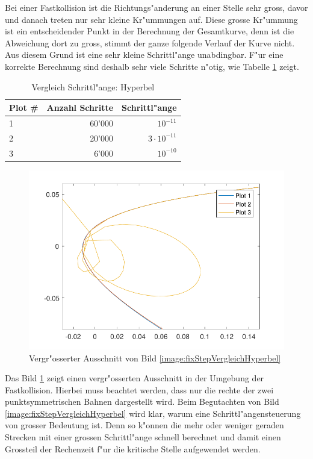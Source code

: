 \begin{refsection}
Bei einer Fastkollision ist die Richtungs"anderung an einer Stelle sehr gross, davor und danach treten nur sehr kleine Kr"ummungen auf.
Diese grosse Kr"ummung ist ein entscheidender Punkt in der Berechnung der Gesamtkurve, denn ist die Abweichung dort zu gross, stimmt der ganze folgende Verlauf der Kurve nicht.
Aus diesem Grund ist eine sehr kleine Schrittl"ange unabdingbar.
F"ur eine korrekte Berechnung sind deshalb sehr viele Schritte n"otig, wie Tabelle \ref{table:fixStepVergleichHyperbel} zeigt.
\begin{table}
\centering
\begin{tabular}{|l|r|r|}
\hline
Plot \# & Anzahl Schritte & Schrittl"ange\\ \hline
1 & 60'000 & $10^{-11}$\\
2 & 20'000 & $3 \cdot 10^{-11}$\\
3 & 6'000 & $10^{-10}$\\
\end{tabular}
\caption{Vergleich Schrittl"ange: Hyperbel}
\label{table:fixStepVergleichHyperbel}
\end{table}
\begin{figure}
\centering
\includegraphics{schrittlaenge/images/fixStepVergleichHyperbelZoom.pdf}
\caption{Vergr"osserter Ausschnitt von Bild \ref{image:fixStepVergleichHyperbel}}
\label{image:fixStepVergleichHyperbelZoom}
\end{figure}

Das Bild \ref{image:fixStepVergleichHyperbelZoom} zeigt einen vergr"osserten Ausschnitt in der Umgebung der Fastkollision.
Hierbei muss beachtet werden, dass nur die rechte der zwei punktsymmetrischen Bahnen dargestellt wird.
Beim Begutachten von Bild \ref{image:fixStepVergleichHyperbel} wird klar, warum eine Schrittl"angensteuerung von grosser Bedeutung ist.
Denn so k"onnen die mehr oder weniger geraden Strecken mit einer grossen Schrittl"ange schnell berechnet und damit einen Grossteil der Rechenzeit f"ur die kritische Stelle aufgewendet werden.


\end{refsection}

